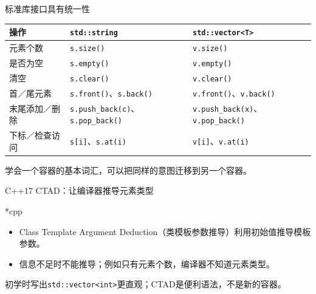 \begin{frame}{标准库接口具有统一性}
\small
\setlength{\tabcolsep}{5pt}
\renewcommand{\arraystretch}{1.25}
\begin{tabular}{lll}
\textbf{操作} & \textbf{\texttt{std::string}} & \textbf{\texttt{std::vector<T>}}\\
\hline
元素个数 & \texttt{s.size()} & \texttt{v.size()}\\
是否为空 & \texttt{s.empty()} & \texttt{v.empty()}\\
清空 & \texttt{s.clear()} & \texttt{v.clear()}\\
首／尾元素 & \texttt{s.front()}、\texttt{s.back()} & \texttt{v.front()}、\texttt{v.back()}\\
末尾添加／删除 & \texttt{s.push\_back(c)}、\texttt{s.pop\_back()} & \texttt{v.push\_back(x)}、\texttt{v.pop\_back()}\\
下标／检查访问 & \texttt{s[i]}、\texttt{s.at(i)} & \texttt{v[i]}、\texttt{v.at(i)}
\end{tabular}

\medskip\normalsize
学会一个容器的基本词汇，可以把同样的意图迁移到另一个容器。
\end{frame}

\begin{frame}{C++17 CTAD：让编译器推导元素类型}
\begin{Code}*{cpp}\end{Code}
\begin{itemize}
\item Class Template Argument Deduction（类模板参数推导）利用初始值推导模板参数。
\item 信息不足时不能推导；例如只有元素个数，编译器不知道元素类型。
\end{itemize}
\medskip
\alert{初学时写出\texttt{std::vector<int>}更直观；CTAD是便利语法，不是新的容器。}
\end{frame}
